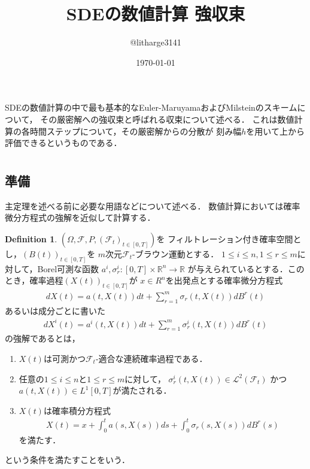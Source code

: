 \documentclass[dvipdfmx,autodetect-engine]{jsarticle}
\theoremstyle{remark}
\theoremstyle{definition}
\newtheorem{definition}{Definition}[section]
\newcommand{\R}{\mathbb{R}}
\begin{document}
\title{SDEの数値計算 強収束}
\author{@litharge3141}
\date{\today}
\maketitle

\abstract{}
SDEの数値計算の中で最も基本的なEuler-MaruyamaおよびMilsteinのスキームについて，
その厳密解への強収束と呼ばれる収束について述べる．
これは数値計算の各時間ステップについて，その厳密解からの分散が
刻み幅$h$を用いて上から評価できるというものである．

\section{}

\subsection{準備}
主定理を述べる前に必要な用語などについて述べる．
数値計算においては確率微分方程式の強解を近似して計算する．
\begin{definition}
    $(\Omega,\mathcal{F},P,(\mathcal{F}_{t})_{t \in [0,T]})$を
    フィルトレーション付き確率空間とし，$(B(t))_{t \in [0,T]}$を
    $m$次元$\mathcal{F}_t$-ブラウン運動とする．
    $1\leq i\leq n, 1\leq r \leq m$に対して，Borel可測な函数
    $a^{i},\sigma_{r}^{i} \colon [0,T] \times \R^{n} \to \R$
    が与えられているとする．このとき，確率過程$(X(t))_{t \in [0,T]}$が
    $x \in R^{n}$を出発点とする確率微分方程式
    \begin{align}
        dX(t) = a(t,X(t)) dt + \sum_{r=1}^{m} \sigma_{r}(t,X(t)) d B^{r}(t)
    \end{align}
    あるいは成分ごとに書いた
    \begin{align}
        dX^{i} (t) = a^{i}(t,X(t)) dt + \sum_{r=1}^{m} \sigma_{r}^{i}(t,X(t)) dB^{r}(t)
    \end{align}
    の強解であるとは，
    \begin{enumerate}
        \item $X(t)$は可測かつ$\mathcal{F}_t$-適合な連続確率過程である．
        \item 任意の$1\leq i\leq n$と$1\leq r\leq m$に対して，
        $\sigma_{r}^{i}(t,X(t)) \in \mathcal{L}^2(\mathcal{F}_t)$
        かつ$a(t,X(t)) \in L^1[0,T]$が満たされる．
        \item $X(t)$は確率積分方程式
        \begin{align}
            X(t) = x + \int_{0}^{t} a(s,X(s))ds + \int_{0}^{t} \sigma_{r}(s,X(s))dB^{r}(s)
        \end{align}
        を満たす．
    \end{enumerate}
    という条件を満たすことをいう．
\end{definition}
\end{document}
